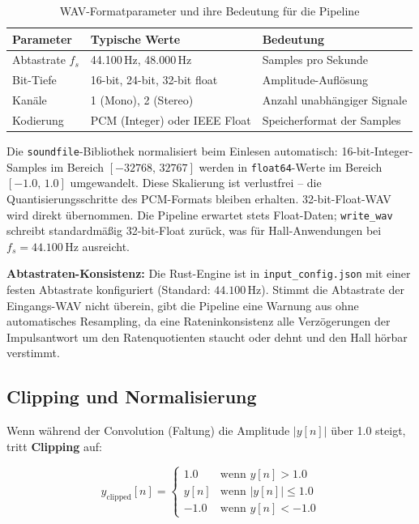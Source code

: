 \documentclass[11pt,a4paper,twoside]{report}
\begin{document}
\begin{table}[H]
    \centering
    \begin{tabular}{|l|l|p{5cm}|}
        \hline
        \textbf{Parameter} & \textbf{Typische Werte} & \textbf{Bedeutung} \\
        \hline
        Abtastrate $f_s$ & 44.100\,Hz, 48.000\,Hz & Samples pro Sekunde \\
        \hline
        Bit-Tiefe & 16-bit, 24-bit, 32-bit float & Amplitude-Aufl\"osung \\
        \hline
        Kan\"ale & 1 (Mono), 2 (Stereo) & Anzahl unabh\"angiger Signale \\
        \hline
        Kodierung & PCM (Integer) oder IEEE Float & Speicherformat der Samples \\
        \hline
    \end{tabular}
    \caption{WAV-Formatparameter und ihre Bedeutung f\"ur die Pipeline}
\end{table}

Die \texttt{soundfile}-Bibliothek normalisiert beim Einlesen automatisch:
16-bit-Integer-Samples im Bereich $[-32768,\,32767]$ werden in \texttt{float64}-Werte
im Bereich $[-1.0,\,1.0]$ umgewandelt. Diese Skalierung ist verlustfrei -- die
Quantisierungsschritte des PCM-Formats bleiben erhalten. 32-bit-Float-WAV
wird direkt \"ubernommen. Die Pipeline erwartet stets Float-Daten; \texttt{write\_wav}
schreibt standardm\"a\ss{}ig 32-bit-Float zur\"uck, was f\"ur Hall-Anwendungen
bei $f_s = 44.100$\,Hz ausreicht.

\textbf{Abtastraten-Konsistenz:} Die Rust-Engine ist in \texttt{input\_config.json}
mit einer festen Abtastrate konfiguriert (Standard: $44.100$\,Hz). Stimmt die
Abtastrate der Eingangs-WAV nicht \"uberein, gibt die Pipeline eine Warnung aus
ohne automatisches Resampling, da eine Rateninkonsistenz alle Verzögerungen
der Impulsantwort um den Ratenquotienten staucht oder dehnt und den Hall
hörbar verstimmt.

\subsection{Clipping und Normalisierung}

Wenn w\"ahrend der Convolution (Faltung) die Amplitude $|y[n]|$ \"uber 1.0 steigt, tritt \textbf{Clipping} auf:

$$y_{\text{clipped}}[n] = \begin{cases}
    1.0 & \text{wenn } y[n] > 1.0 \\
    y[n] & \text{wenn } |y[n]| \leq 1.0 \\
    -1.0 & \text{wenn } y[n] < -1.0
\end{cases}$$
\end{document}
